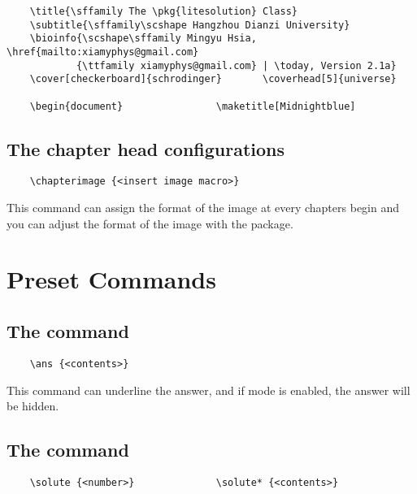 \documentclass[ans,mtpro2]{litesolution}
\begin{document}
\begin{verbatim}
    \title{\sffamily The \pkg{litesolution} Class}
    \subtitle{\sffamily\scshape Hangzhou Dianzi University}
    \bioinfo{\scshape\sffamily Mingyu Hsia, \href{mailto:xiamyphys@gmail.com}
            {\ttfamily xiamyphys@gmail.com} | \today, Version 2.1a}
    \cover[checkerboard]{schrodinger}       \coverhead[5]{universe}

    \begin{document}                \maketitle[Midnightblue]
\end{verbatim}

\subsection{The chapter head configurations}

\begin{verbatim}
    \chapterimage {<insert image macro>}
\end{verbatim}

This command can assign the format of the image at every chapters begin and you can adjust the format of the image with the  package.

\section{Preset Commands}

\subsection{The  command}

\begin{verbatim}
    \ans {<contents>}
\end{verbatim}
 
This command can underline the answer, and if mode  is enabled, the answer will be hidden.

\subsection{The  command}

\begin{verbatim}
    \solute {<number>}              \solute* {<contents>}
\end{verbatim}
\end{document}
